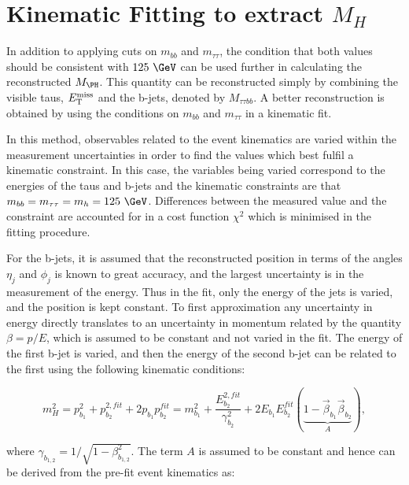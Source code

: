 \section{Kinematic Fitting to extract $M_{H}$}
\label{sec:kinematicfit}

In addition to applying cuts on $m_{bb}$ and $m_{\tau\tau}$, the condition that
both values should be consistent with $125~\GeV$ can be used further in
calculating the reconstructed $M_{\PH}$. This quantity can be reconstructed simply
by combining the visible taus, $E_{\mathrm{T}}^{\text{miss}}$ and the b-jets, denoted by $M_{\tau\tau bb}$.
A better reconstruction is obtained by using the conditions on $m_{bb}$ and
$m_{\tau\tau}$ in a kinematic fit. 

In this method, observables related to the
event kinematics are varied within the measurement uncertainties in order to
find the values which best fulfil a kinematic constraint. In this case, the
variables being varied correspond to the energies of the taus and b-jets and the
kinematic constraints are that $m_{bb} = m_{\tau\tau} = m_{h} = 125~\GeV$. Differences
between the measured value and the constraint are accounted for in a cost
function $\chi^{2}$ which is minimised in the fitting procedure.  

For the b-jets, it is assumed that the reconstructed position in terms of the
angles $\eta_{j}$ and $\phi_{j}$ is known to great accuracy, and the largest
uncertainty is in the measurement of the energy. Thus in the fit, only the
energy of the jets is varied, and the position is kept constant. To first
approximation any uncertainty in energy directly translates to an uncertainty in
momentum related by the quantity $\beta = p/E$, which is assumed to be constant and 
not varied in the fit. The energy of the first b-jet is varied, and then the
energy of the second b-jet can be related to the first using the following
kinematic conditions:

\begin{equation}
m_{H}^{2} = p_{b_{1}}^{2} + p_{b_{2}}^{2,fit} + 2p_{b_{1}}p_{b_{2}}^{fit} 
          = m_{b_{1}}^{2} + \frac{E_{b_{2}}^{2,fit}}{\gamma_{b_{2}}^{2}} +
          2E_{b_{1}}E_{b_{2}}^{fit}\left(\underbrace{1-\vec{\beta}_{b_{1}}\vec{\beta}_{b_{2}}}_{A}\right),   
\label{eq:bjetkinfit}         
\end{equation}

where $\gamma_{b_{1,2}} = 1/\sqrt{1-\beta_{b_{1,2}}^{2}}$. The term $A$ is
assumed to be constant and hence can be derived from the pre-fit event
kinematics as:

